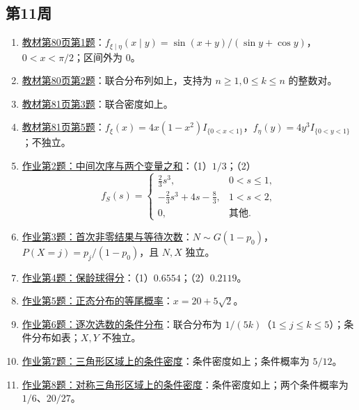 \subsection*{第11周}
\begin{enumerate}
\item \hyperref[ex:w11-b80-1]{教材第80页第1题}：$f_{\xi\mid\eta}(x\mid y)=\sin(x+y)/(\sin y+\cos y)$，$0<x<\pi/2$；区间外为 $0$。
\item \hyperref[ex:w11-b80-2]{教材第80页第2题}：联合分布列如上，支持为 $n\geq1,0\leq k\leq n$ 的整数对。
\item \hyperref[ex:w11-b81-3]{教材第81页第3题}：联合密度如上。
\item \hyperref[ex:w11-b81-5]{教材第81页第5题}：$f_\xi(x)=4x(1-x^2)I_{\{0<x<1\}}$，$f_\eta(y)=4y^3I_{\{0<y<1\}}$；不独立。
\item \hyperref[ex:w11-h2]{作业第2题：中间次序与两个变量之和}：（1）$1/3$；（2）
\[
f_S(s)=\begin{cases}\frac23s^3,&0<s\leq1,\\-\frac23s^3+4s-\frac83,&1<s<2,\\0,&\text{其他}.\end{cases}
\]
\item \hyperref[ex:w11-h3]{作业第3题：首次非零结果与等待次数}：$N\sim G(1-p_0)$，$P(X=j)=p_j/(1-p_0)$，且 $N,X$ 独立。
\item \hyperref[ex:w11-h4]{作业第4题：保龄球得分}：（1）$0.6554$；（2）$0.2119$。
\item \hyperref[ex:w11-h5]{作业第5题：正态分布的等尾概率}：$x=20+5\sqrt2$。
\item \hyperref[ex:w11-h6]{作业第6题：逐次选数的条件分布}：联合分布为 $1/(5k)$（$1\leq j\leq k\leq5$）；条件分布如表；$X,Y$ 不独立。
\item \hyperref[ex:w11-h7]{作业第7题：三角形区域上的条件密度}：条件密度如上；条件概率为 $5/12$。
\item \hyperref[ex:w11-h8]{作业第8题：对称三角形区域上的条件密度}：条件密度如上；两个条件概率为 $1/6$、$20/27$。
\end{enumerate}
